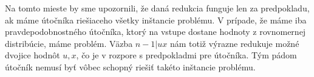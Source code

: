 \begin{poznamka}
Na tomto mieste by sme upozornili, že daná redukcia funguje len za
predpokladu, ak máme útočníka riešiaceho všetky inštancie problému.
V prípade, že máme iba pravdepodobnostného útočníka, ktorý na vstupe
dostane hodnoty z rovnomernej distribúcie, máme problém.
Väzba $n-1 | ux$ nám totiž výrazne redukuje možné dvojice hodnôt
$u,x$, čo je v rozpore s predpokladmi pre útočníka. Tým pádom útočník
nemusí byť vôbec schopný riešiť takéto inštancie problému.
\end{poznamka}

